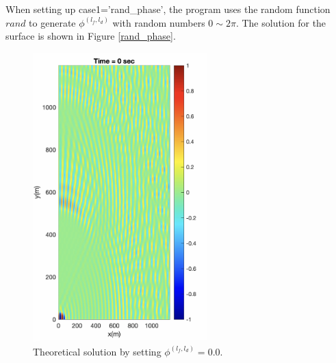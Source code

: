 \documentclass[preprint,10pt]{elsarticle}
\begin{document}
 When setting up case1='rand\_phase', the program uses the random function $rand$ to generate $\phi^{(l_f,l_d)}$ with random numbers $0 \sim 2\pi$. The solution for the surface is shown in Figure \ref{rand_phase}. 
  \begin{figure}
\begin{center}
 \includegraphics[width=0.6\textwidth]{figures/zero_phase.png}
 \caption{Theoretical solution by setting  $\phi^{(l_f,l_d)} = 0.0$.}
 \label{zero_phase}
 \end{center}
 \end{figure}
\end{document}

